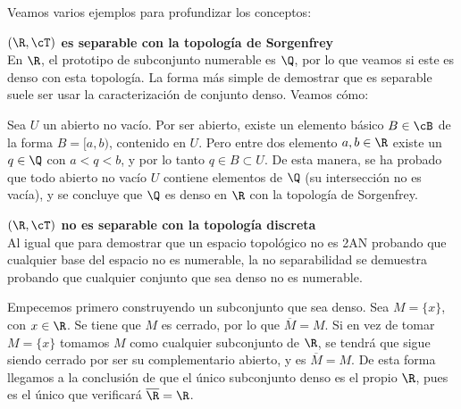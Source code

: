 Veamos varios ejemplos para profundizar los conceptos:

\begin{ejs}
    \item {\bf  $(\R, \cT)$ es separable con la topología de Sorgenfrey}\\
    En $\R$, el prototipo de subconjunto numerable es $\Q$, por lo que veamos si este es denso con esta topología. La forma más simple de demostrar que es separable suele ser usar la caracterización de conjunto denso. Veamos cómo:
    
    Sea $U$ un abierto no vacío. Por ser abierto, existe un elemento básico $B\in\cB$ de la forma $B = [a,b)$, contenido en $U$. Pero entre dos elemento $a,b\in\R$ existe un $q\in\Q$ con $a<q<b$, y por lo tanto $q \in B \subset U$. De esta manera, se ha probado que todo abierto no vacío $U$ contiene elementos de $\Q$ (su intersección no es vacía), y se concluye que $\Q$ es denso en $\R$ con la topología de Sorgenfrey.

    \item {\bf  $(\R, \cT)$ no es separable con la topología discreta}\\
    Al igual que para demostrar que un espacio topológico no es 2AN probando que cualquier base del espacio no es numerable, la no separabilidad se demuestra probando que cualquier conjunto que sea denso no es numerable.

    Empecemos primero construyendo un subconjunto que sea denso. Sea $M = \{x\}$, con $x\in\R$. Se tiene que $M$ es cerrado, por lo que $\overline{M} = M$. Si en vez de tomar $M = \{x\}$ tomamos $M$ como cualquier subconjunto de $\R$, se tendrá que sigue siendo cerrado por ser su complementario abierto, y es $\overline{M} = M$. De esta forma llegamos a la conclusión de que el único subconjunto denso es el propio $\R$, pues es el único que verificará $\overline{\R} = \R$.
\end{ejs}


{}

